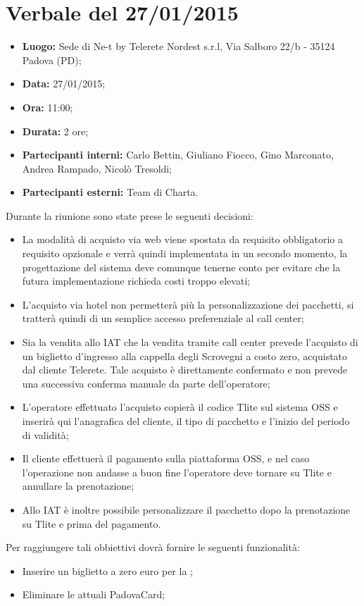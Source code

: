 \pagebreak
\section{Verbale del  27/01/2015}\label{verbale}
\begin{itemize}
\item \textbf{Luogo:} Sede di Ne-t by Telerete Nordest s.r.l, Via Salboro 22/b - 35124 Padova (PD);
\item \textbf{Data:} 27/01/2015;
\item \textbf{Ora:} 11:00;
\item \textbf{Durata:} 2 ore;
\item \textbf{Partecipanti interni:} Carlo Bettin, Giuliano Fiocco, Gino Marconato, Andrea Rampado, Nicolò Tresoldi;
\item \textbf{Partecipanti esterni:} Team di Charta.

\end{itemize}
Durante la riunione sono state prese le seguenti decisioni:
\begin{itemize}
\item La modalità di acquisto via web viene spostata da requisito obbligatorio a requisito opzionale e verrà quindi implementata in un secondo momento, la progettazione del sistema deve comunque tenerne conto per evitare che la futura implementazione richieda costi troppo elevati;
\item L'acquisto via hotel non permetterà più la personalizzazione dei pacchetti, si tratterà quindi di un semplice accesso preferenziale al call center;
\item Sia la vendita allo IAT che la vendita tramite call center prevede l'acquisto di un biglietto d'ingresso alla cappella degli Scrovegni a costo zero, acquistato dal cliente Telerete. Tale acquisto è direttamente confermato e non prevede una successiva conferma manuale da parte dell'operatore;
\item L'operatore effettuato l'acquisto copierà il codice Tlite sul sistema OSS e inserirà qui l'anagrafica del cliente, il tipo di pacchetto e l'inizio del periodo di validità;
\item Il cliente effettuerà il pagamento sulla piattaforma OSS, e nel caso l'operazione non andasse a buon fine l'operatore deve tornare su Tlite e annullare la prenotazione;
\item Allo IAT è inoltre possibile personalizzare il pacchetto dopo la prenotazione su Tlite e prima del pagamento.
\end{itemize}

Per raggiungere tali obbiettivi \charta dovrà fornire le seguenti funzionalità:
\begin{itemize}
\item Inserire un biglietto a zero euro per la \cappella;
\item Eliminare le attuali PadovaCard;
\end{itemize}


